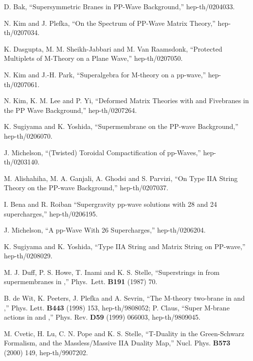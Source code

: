 \documentclass[a4paper,12pt]{article}
\begin{document}
\begin{thebibliography}{99}
 D. Bak, ``Supersymmetric Branes in PP-Wave
  Background,'' hep-th/0204033.

 N. Kim and J. Plefka, ``On the Spectrum of PP-Wave
  Matrix Theory,'' hep-th/0207034.

 K. Dasgupta, M. M. Sheikh-Jabbari and M. Van
  Raamsdonk, ``Protected Multiplets of M-Theory on a Plane Wave,''
  hep-th/0207050.

 N. Kim and J.-H. Park, ``Superalgebra for M-theory on
  a pp-wave,'' hep-th/0207061.

 N. Kim, K. M. Lee and P. Yi, ``Deformed Matrix
  Theories with \coordHE{} and Fivebranes in the PP Wave
  Background,'' hep-th/0207264.

 K. Sugiyama and K. Yoshida, ``Supermembrane on the
  PP-wave Background,'' hep-th/0206070.
  
 J. Michelson, ``(Twisted) Toroidal Compactification
  of pp-Waves,'' hep-th/0203140.
  
 M. Alishahiha, M. A. Ganjali, A. Ghodsi and S.
  Parvizi, ``On Type IIA String Theory on the PP-wave Background,''
  hep-th/0207037.

 I. Bena and R. Roiban ``Supergravity pp-wave
  solutions with 28 and 24 supercharges,'' hep-th/0206195.

 J. Michelson, ``A pp-Wave With 26 Supercharges,''
  hep-th/0206204.

 K. Sugiyama and K. Yoshida, ``Type IIA String and
  Matrix String on PP-wave,'' hep-th/0208029.

 M. J. Duff, P. S. Howe, T. Inami and K. S. Stelle,
  ``Superstrings in \coordHE{} from supermembranes in \coordHE{},''
  Phys.~Lett.  {\bf B191} (1987) 70.
  
 B. de Wit, K. Peeters, J. Plefka and A. Sevrin, ``The
  M-theory two-brane in \coordHE{} and \coordHE{},''
  Phys. Lett. {\bf B443} (1998) 153, hep-th/9808052; P. Claus, ``Super
  M-brane actions in \coordHE{} and \coordHE{},''
  Phys. Rev. {\bf D59} (1999) 066003, hep-th/9809045.

 M. Cvetic, H. Lu, C. N. Pope and K. S. Stelle,
  ``T-Duality in the Green-Schwarz Formalism, and the Massless/Massive
  IIA Duality Map,'' Nucl. Phys. {\bf B573} (2000) 149,
  hep-th/9907202.
  

\end{thebibliography}
\end{document}
